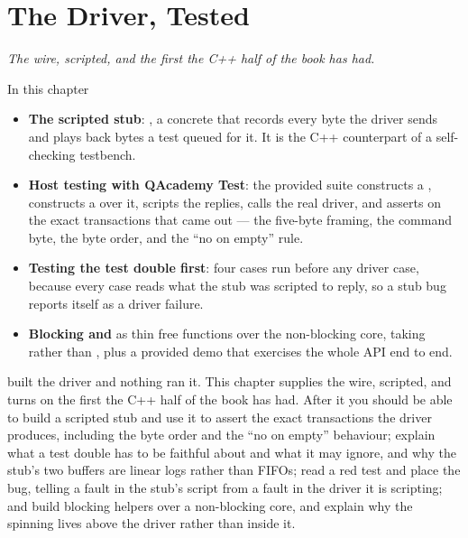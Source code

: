 
\chapter{The Driver, Tested}
\label{c8:ch}

{\large\itshape The wire, scripted, and the first  the C++ half of the book has
had.\par}

\begin{chapterbox}{In this chapter}
\begin{itemize}
  \item \textbf{The scripted stub}: , a concrete
     that records every byte the driver sends and plays back
    bytes a test queued for it. It is the C++ counterpart of a self-checking testbench.
  \item \textbf{Host testing with QAcademy Test}: the provided suite constructs a ,
    constructs a  over it, scripts the replies, calls the real driver, and asserts on the
    exact transactions that came out --- the five-byte framing, the command byte, the byte order,
    and the ``no  on empty'' rule.
  \item \textbf{Testing the test double first}: four  cases run before any driver
    case, because every  case reads what the stub was scripted to reply, so a stub bug
    reports itself as a driver failure.
  \item \textbf{Blocking  and } as thin free functions over the non-blocking
    core, taking  rather than , plus a provided demo that exercises the
    whole API end to end.
\end{itemize}
\end{chapterbox}

 built the driver and nothing ran it. This chapter supplies the wire, scripted, and turns
on the first  the C++ half of the book has had. After it you should be able to build
a scripted stub and use it to assert the exact transactions the driver produces, including the byte
order and the ``no  on empty'' behaviour; explain what a test double has to be faithful
about and what it may ignore, and why the stub's two buffers are linear logs rather than FIFOs; read
a red test and place the bug, telling a fault in the stub's script from a fault in the driver it is
scripting; and build blocking helpers over a non-blocking core, and explain why the spinning lives
above the driver rather than inside it.

